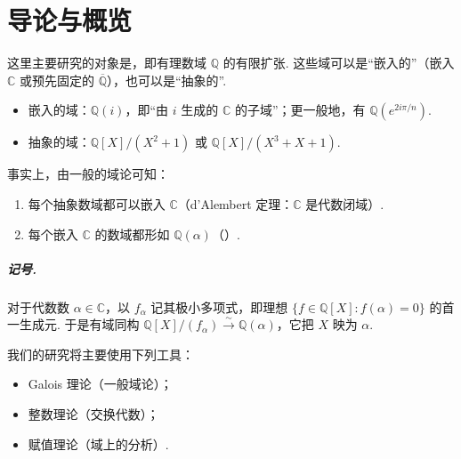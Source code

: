 \chapter{导论与概览}\label{chap:nt-1}


这里主要研究的对象是，即有理数域 $\mathbb{Q}$ 的有限扩张. 这些域可以是``嵌入的''（嵌入 $\mathbb{C}$ 或预先固定的 $\overline{\mathbb{Q}}$），也可以是``抽象的''.

\begin{example*}

\begin{itemize}

\item 嵌入的域：$\mathbb{Q}(i)$，即``由 $i$ 生成的 $\mathbb{C}$ 的子域''；更一般地，有 $\mathbb{Q}(e^{2i\pi/n})$.

\item 抽象的域：$\mathbb{Q}[X]/(X^2+1)$ 或 $\mathbb{Q}[X]/(X^3+X+1)$.

\end{itemize}

\end{example*}

事实上，由一般的域论可知：

\begin{enumerate}[label=\roman*)]

\item 每个抽象数域都可以嵌入 $\mathbb{C}$（d'Alembert 定理：$\mathbb{C}$ 是代数闭域）.

\item 每个嵌入 $\mathbb{C}$ 的数域都形如 $\mathbb{Q}(\alpha)$（）.

\end{enumerate}

\paragraph{记号.} 对于代数数 $\alpha\in\mathbb{C}$，以 $f_\alpha$ 记其极小多项式，即理想 $\{f\in\mathbb{Q}[X]:f(\alpha)=0\}$ 的首一生成元. 于是有域同构 $\mathbb{Q}[X]/(f_\alpha)\xrightarrow{\sim}\mathbb{Q}(\alpha)$，它把 $X$ 映为 $\alpha$.

我们的研究将主要使用下列工具：

\begin{itemize}

\item Galois 理论（一般域论）；

\item 整数理论（交换代数）；

\item 赋值理论（域上的分析）.

\end{itemize}


